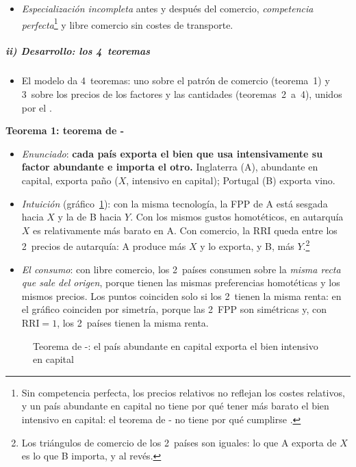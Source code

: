 \documentclass[11pt]{article}
\begin{document}
\begin{itemize}
  \begin{itemize}
  \item \emph{física}: $\overline K^A/\overline L^A>\overline K^B/\overline L^B$;
  \item \emph{por precios}: $(w/r)^A>(w/r)^B$ en autarquía (el capital es relativamente más barato en A).
  \end{itemize}
\item \emph{Especialización incompleta} antes y después del comercio, \emph{competencia perfecta}\footnote{Sin competencia perfecta, los precios relativos no reflejan los costes relativos, y un país abundante en capital no tiene por qué tener más barato el bien intensivo en capital: el teorema de - no tiene por qué cumplirse .} y libre comercio sin costes de transporte.
\end{itemize}

\subparagraph{ii) Desarrollo: los 4~teoremas}

\begin{itemize}
\item El modelo da 4~teoremas: uno sobre el patrón de comercio (teorema~1) y 3~sobre los precios de los factores y las cantidades (teoremas~2~a~4), unidos por el .
\end{itemize}

\textbf{Teorema 1: teorema de -}

\begin{itemize}
\item \emph{Enunciado}: \textbf{cada país exporta el bien que usa intensivamente su factor abundante e importa el otro.} Inglaterra (A), abundante en capital, exporta paño ($X$, intensivo en capital); Portugal (B) exporta vino.

\item \emph{Intuición} (gráfico~\ref{fig:teorema-ho}): con la misma tecnología, la FPP de A está sesgada hacia $X$ y la de B hacia $Y$. Con los mismos gustos homotéticos, en autarquía $X$ es relativamente más barato en A. Con comercio, la RRI queda entre los 2~precios de autarquía: A produce más $X$ y lo exporta, y B, más $Y$.\footnote{Los triángulos de comercio de los 2~países son iguales: lo que A exporta de $X$ es lo que B importa, y al revés.}
\item \emph{El consumo}: con libre comercio, los 2~países consumen sobre la \emph{misma recta que sale del origen}, porque tienen las mismas preferencias homotéticas y los mismos precios. Los puntos coinciden solo si los 2~tienen la misma renta: en el gráfico coinciden por simetría, porque las 2~FPP son simétricas y, con $\mathrm{RRI}=1$, los 2~países tienen la misma renta.
\end{itemize}
\begin{figure}[H]
\centering
\caption{Teorema de -: el país abundante en capital exporta el bien intensivo en capital}\label{fig:teorema-ho}
\end{figure}
\end{document}
